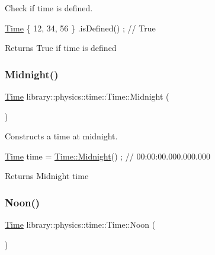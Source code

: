 Check if time is defined. 


\begin{DoxyCode}
\hyperlink{classlibrary_1_1physics_1_1time_1_1_time_a46a4b9be1451041ae65332f04db21c4b}{Time} \{ 12, 34, 56 \} .isDefined() ; \textcolor{comment}{// True}
\end{DoxyCode}


\begin{DoxyReturn}{Returns}
True if time is defined 
\end{DoxyReturn}
\mbox{\label{classlibrary_1_1physics_1_1time_1_1_time_a03dac8a95c9e8f64ef98c5370112b3b8}} 
\subsubsection{\texorpdfstring{Midnight()}{Midnight()}}
{\footnotesize\ttfamily \hyperlink{classlibrary_1_1physics_1_1time_1_1_time}{Time} library\+::physics\+::time\+::\+Time\+::\+Midnight (\begin{DoxyParamCaption}{ }\end{DoxyParamCaption})\hspace{0.3cm}{\ttfamily [static]}}



Constructs a time at midnight. 


\begin{DoxyCode}
\hyperlink{classlibrary_1_1physics_1_1time_1_1_time_a46a4b9be1451041ae65332f04db21c4b}{Time} time = \hyperlink{classlibrary_1_1physics_1_1time_1_1_time_a03dac8a95c9e8f64ef98c5370112b3b8}{Time::Midnight}() ; \textcolor{comment}{// 00:00:00.000.000.000}
\end{DoxyCode}


\begin{DoxyReturn}{Returns}
Midnight time 
\end{DoxyReturn}
\mbox{\label{classlibrary_1_1physics_1_1time_1_1_time_a3d67891fe71e3b5ba62c6517477e7698}} 
\subsubsection{\texorpdfstring{Noon()}{Noon()}}
{\footnotesize\ttfamily \hyperlink{classlibrary_1_1physics_1_1time_1_1_time}{Time} library\+::physics\+::time\+::\+Time\+::\+Noon (\begin{DoxyParamCaption}{ }\end{DoxyParamCaption})\hspace{0.3cm}{\ttfamily [static]}}



